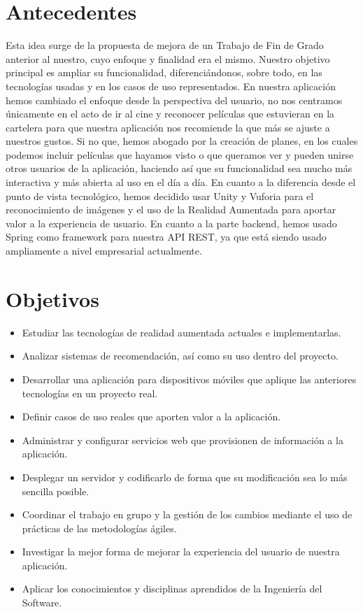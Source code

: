 \section{Antecedentes}
\label{makereference1.1}
\begin{flushleft}
    Esta idea surge de la propuesta de mejora de un Trabajo de Fin de Grado anterior
    al nuestro, cuyo enfoque y finalidad era el mismo. Nuestro objetivo principal es 
    ampliar su funcionalidad, diferenciándonos, sobre todo, en las tecnologías usadas y 
    en los casos de uso representados.
    En nuestra aplicación hemos cambiado el enfoque desde la perspectiva del usuario, no 
    nos centramos únicamente en el acto de ir al cine y reconocer películas que estuvieran en la cartelera
    para que nuestra aplicación nos recomiende la que más se ajuste a nuestros gustos. Si no que, hemos 
    abogado por la creación de planes, en los cuales podemos incluir películas que hayamos visto o que queramos ver
    y pueden unirse otros usuarios de la aplicación, haciendo así que su funcionalidad sea mucho más interactiva y más
    abierta al uso en el día a día.
    En cuanto a la diferencia desde el punto de vista tecnológico, hemos decidido usar Unity y Vuforia para el reconocimiento
    de imágenes y el uso de la Realidad Aumentada para aportar valor a la experiencia de usuario. En cuanto a la parte backend, 
    hemos usado Spring como framework para nuestra API REST, ya que está siendo usado ampliamente a nivel empresarial actualmente.
\end{flushleft}
\newpage
\section{Objetivos}
\label{makereference1.2}
\begin{itemize}  
    \item Estudiar las tecnologías de realidad aumentada actuales e implementarlas.
    \item Analizar sistemas de recomendación, así como su uso dentro del proyecto.
    \item Desarrollar una aplicación para dispositivos móviles que aplique las anteriores tecnologías en un proyecto real.
    \item Definir casos de uso reales que aporten valor a la aplicación.
    \item Administrar y configurar servicios web que provisionen de información a la aplicación.
    \item Desplegar un servidor y codificarlo de forma que su modificación sea lo más sencilla posible.
    \item Coordinar el trabajo en grupo y la gestión de los cambios mediante el uso de prácticas de las metodologías ágiles.
    \item Investigar la mejor forma de mejorar la experiencia del usuario de nuestra aplicación.
    \item Aplicar los conocimientos y disciplinas aprendidos de la Ingeniería del Software.
\end{itemize}

